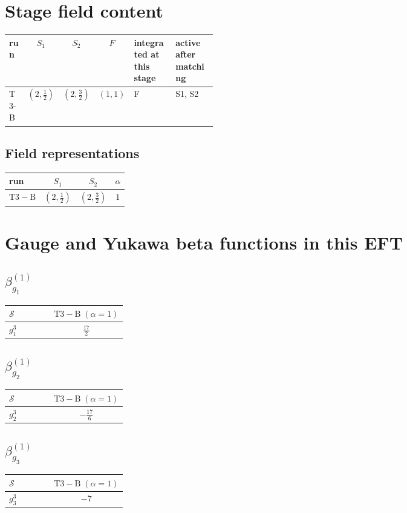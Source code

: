 \documentclass[9pt]{article}
\begin{document}
\section*{Stage field content}
\begin{longtable}{@{}lccc p{0.20\linewidth}p{0.20\linewidth}@{}}
\toprule
run & $S_1$ & $S_2$ & $F$ & integrated at this stage & active after matching \\
\midrule
T3-B & $(2,\frac{1}{2})$ & $(2,\frac{3}{2})$ & $(1,1)$ & F & S1, S2 \\
\bottomrule
\end{longtable}
\subsection*{Field representations}
\begin{longtable}{@{}lccc@{}}
\toprule
run & $S_1$ & $S_2$ & $\alpha$ \\
\midrule
$\mathrm{T3-B}$ & $(2,\frac{1}{2})$ & $(2,\frac{3}{2})$ & $1$ \\
\bottomrule
\end{longtable}
\section*{Gauge and Yukawa beta functions in this EFT}
\subsection*{$ \beta_{g_1}^{(1)} $}
\begin{longtable}{@{}p{0.38\linewidth}c@{}}
\toprule
$\mathcal{S}$ & $ \mathrm{T3-B}\;(\alpha=1) $ \\
\midrule
$ g_1^3 $ & $ \frac{17}{2} $ \\
\bottomrule
\end{longtable}
\subsection*{$ \beta_{g_2}^{(1)} $}
\begin{longtable}{@{}p{0.38\linewidth}c@{}}
\toprule
$\mathcal{S}$ & $ \mathrm{T3-B}\;(\alpha=1) $ \\
\midrule
$ g_2^3 $ & $ - \frac{17}{6} $ \\
\bottomrule
\end{longtable}
\subsection*{$ \beta_{g_3}^{(1)} $}
\begin{longtable}{@{}p{0.38\linewidth}c@{}}
\toprule
$\mathcal{S}$ & $ \mathrm{T3-B}\;(\alpha=1) $ \\
\midrule
$ g_3^3 $ & $ -7 $ \\
\bottomrule
\end{longtable}
\end{document}
